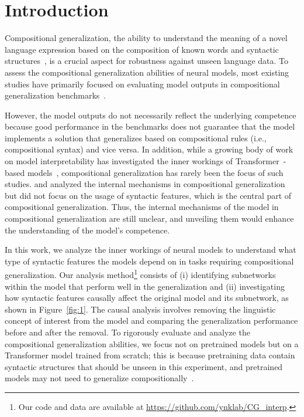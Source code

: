 \section{Introduction}
\label{sec:introduction}
Compositional generalization, the ability to understand the meaning of a novel language expression based on the composition of known words and syntactic structures~\citep{partee1984compositionality, fodor1988connectionism}, is a crucial aspect for robustness against unseen language data.
To assess the compositional generalization abilities of neural models, most existing studies have primarily focused on evaluating model outputs in compositional generalization benchmarks~\citep{kim-linzen-2020-cogs, li-etal-2021-compositional, dankers-etal-2022-paradox, li-etal-2023-slog}.

However, the model outputs do not necessarily reflect the underlying competence because good performance in the benchmarks does not guarantee that the model implements a solution that generalizes based on compositional rules (i.e., compositional syntax) and vice versa.
In addition, while a growing body of work on model interpretability has investigated the inner workings of Transformer~\citep{vaswani2017attention}-based models~\citep{ferrando2024primerinnerworkingstransformerbased, rai2024practicalreviewmechanisticinterpretability}, compositional generalization has rarely been the focus of such studies.
\citet{yao-koller-2022-structural} and \citet{murty2023characterizing} analyzed the internal mechanisms in compositional generalization but did not focus on the usage of syntactic features, which is the central part of compositional generalization.
Thus, the internal mechanisms of the model in compositional generalization are still unclear, and unveiling them would enhance the understanding of the model's competence.

In this work, we analyze the inner workings of neural models to understand what type of syntactic features the models depend on in tasks requiring compositional generalization.
Our analysis method\footnote{Our code and data are available at \url{https://github.com/ynklab/CG_interp}.} consists of (i) identifying subnetworks within the model that perform well in the generalization and (ii) investigating how syntactic features causally affect the original model and its subnetwork, as shown in Figure~\ref{fig:1}.
The causal analysis involves removing the linguistic concept of interest from the model and comparing the generalization performance before and after the removal.
To rigorously evaluate and analyze the compositional generalization abilities, we focus not on pretrained models but on a Transformer model trained from scratch; this is because pretraining data contain syntactic structures that should be unseen in this experiment, and pretrained models may not need to generalize compositionally~\citep{kim2022uncontrolledlexicalexposureleads}.

